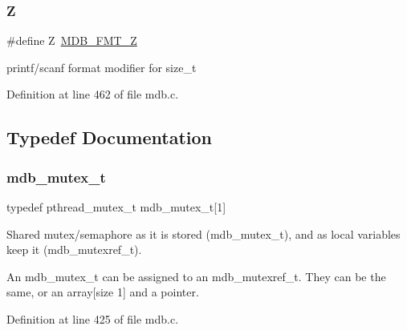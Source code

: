 \subsubsection{\texorpdfstring{Z}{Z}}
{\footnotesize\ttfamily \#define Z~\mbox{\hyperlink{lmdb_8h_a02f14b3b04c0dabb94e0742ca77882d1}{M\+D\+B\+\_\+\+F\+M\+T\+\_\+Z}}}

printf/scanf format modifier for size\+\_\+t 

Definition at line 462 of file mdb.\+c.



\subsection{Typedef Documentation}
\mbox{\label{group__compat_ga9b7b61d0ad68b601d11d93e5c1193391}} 
\subsubsection{\texorpdfstring{mdb\+\_\+mutex\+\_\+t}{mdb\_mutex\_t}}
{\footnotesize\ttfamily typedef pthread\+\_\+mutex\+\_\+t mdb\+\_\+mutex\+\_\+t\mbox{[}1\mbox{]}}

Shared mutex/semaphore as it is stored (mdb\+\_\+mutex\+\_\+t), and as local variables keep it (mdb\+\_\+mutexref\+\_\+t).

An mdb\+\_\+mutex\+\_\+t can be assigned to an mdb\+\_\+mutexref\+\_\+t. They can be the same, or an array\mbox{[}size 1\mbox{]} and a pointer. 

Definition at line 425 of file mdb.\+c.

